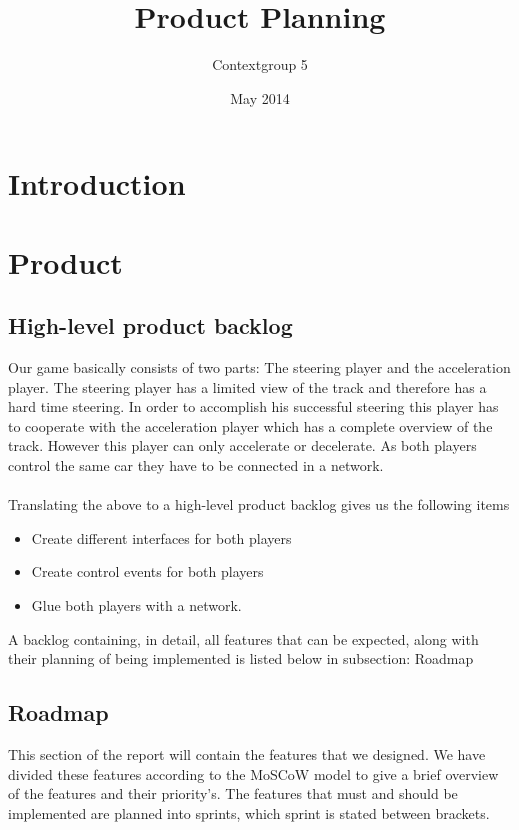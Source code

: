 \documentclass{article}
\title{Product Planning}
\author{Contextgroup 5}
\date{May 2014}
\begin{document}
\maketitle

\section{Introduction}
\section{Product}
\subsection{High-level product backlog}
Our game basically consists of two parts: The \gls{steering player} and the \gls{acceleration player}. The steering player has a limited view of the track and therefore has a hard time steering. In order to accomplish his successful steering this player has to cooperate with the acceleration player which has a complete overview of the track. However this player can only accelerate or decelerate. As both players control the same car they have to be connected in a network. \\\\
Translating the above to a high-level product backlog gives us the following items
\begin{itemize}
	\item Create different interfaces for both players
	\item Create control events for both players
	\item Glue both players with a network.
\end{itemize}
A backlog containing, in detail, all features that can be expected, along with their planning of being implemented is listed below in subsection: Roadmap
\subsection{Roadmap}
This section of the report will contain the features that we designed. We have divided these features according to the \gls{MoSCoW} model to give a brief overview of the features and their priority's. The features that must and should be implemented are planned into sprints, which sprint is stated between brackets.
\end{document}
